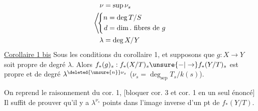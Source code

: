 \[
\left\langle\begin{aligned}
\nu&=\sup\nu_s\\
&\hspace{-1em}\left\{\begin{aligned}n&=\deg T/S\\d&=\dim.\ \text{fibres de }g\end{aligned}\right.\\
\lambda&=\deg X/Y
\end{aligned}\right.
\]
\uline{Corollaire 1 bis} Sous les conditions du corollaire 1,
  et supposons que
  $g:X\to Y$ soit propre de degré  $\lambda$.
Alors $f_\ast(g)_s:f_\ast(X/T)_s\unsure{\mathbin{-}|\to}f_\ast(Y/T)_s$ est
propre et de degré $\lambda^{\deleted{\unsure{n}}\nu_s}$ ($\nu_s=\deg_{\mathrm{sep}}T_s/k(s)$).

On reprend le raisonnement du cor. 1,
[bloquer cor. 3 et cor. 1 en un
seul énoncé] Il suffit de prouver
qu'il y a \uline{} $\lambda^{\nu_s}$ points dans
l'image inverse d'un pt de $f_\ast(Y/T)$.

